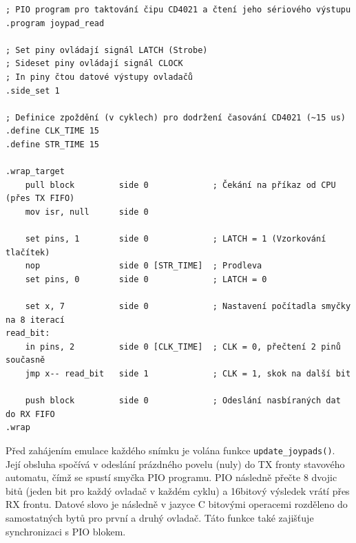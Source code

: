 \begin{listing}[htbp]
\small
\begin{verbatim}
; PIO program pro taktování čipu CD4021 a čtení jeho sériového výstupu
.program joypad_read

; Set piny ovládají signál LATCH (Strobe)
; Sideset piny ovládají signál CLOCK
; In piny čtou datové výstupy ovladačů
.side_set 1

; Definice zpoždění (v cyklech) pro dodržení časování CD4021 (~15 us)
.define CLK_TIME 15
.define STR_TIME 15

.wrap_target
    pull block         side 0             ; Čekání na příkaz od CPU (přes TX FIFO)
    mov isr, null      side 0

    set pins, 1        side 0             ; LATCH = 1 (Vzorkování tlačítek)
    nop                side 0 [STR_TIME]  ; Prodleva
    set pins, 0        side 0             ; LATCH = 0

    set x, 7           side 0             ; Nastavení počítadla smyčky na 8 iterací
read_bit:
    in pins, 2         side 0 [CLK_TIME]  ; CLK = 0, přečtení 2 pinů současně
    jmp x-- read_bit   side 1             ; CLK = 1, skok na další bit

    push block         side 0             ; Odeslání nasbíraných dat do RX FIFO
.wrap
\end{verbatim}
\caption{Zdrojový kód PIO programu pro asynchronní čtení ovladačů.}
\label{lst:pio_joypad}
\end{listing}

Před zahájením emulace každého snímku je volána funkce \texttt{update\_joypads()}. Její obsluha
spočívá v odeslání prázdného povelu (nuly) do TX fronty stavového automatu, čímž se spustí smyčka
PIO programu. PIO následně přečte 8 dvojic bitů (jeden bit pro každý ovladač v každém cyklu) a
16bitový výsledek vrátí přes RX frontu. Datové slovo je následně v jazyce C bitovými operacemi
rozděleno do samostatných bytů pro první a druhý ovladač. Táto funkce také zajišťuje synchronizaci s
PIO blokem.
